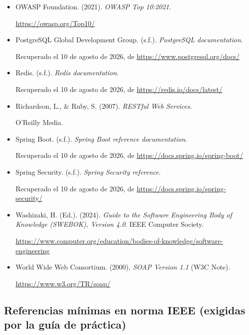 \documentclass[12pt,a4paper]{article}
\begin{document}
\begin{itemize}[leftmargin=1.5cm, itemindent=-1.5cm, itemsep=5pt]
  \item \hypertarget{ref:owasp}{OWASP Foundation. (2021). \textit{OWASP Top 10:2021}.} \url{https://owasp.org/Top10/}
  \item \hypertarget{ref:postgres}{PostgreSQL Global Development Group. (s.f.). \textit{PostgreSQL documentation}.} Recuperado el 10 de agosto de 2026, de \url{https://www.postgresql.org/docs/}
  \item \hypertarget{ref:redis}{Redis. (s.f.). \textit{Redis documentation}.} Recuperado el 10 de agosto de 2026, de \url{https://redis.io/docs/latest/}
  \item \hypertarget{ref:richardson}{Richardson, L., \& Ruby, S. (2007). \textit{RESTful Web Services}.} O'Reilly Media.
  \item \hypertarget{ref:springboot}{Spring Boot. (s.f.). \textit{Spring Boot reference documentation}.} Recuperado el 10 de agosto de 2026, de \url{https://docs.spring.io/spring-boot/}
  \item \hypertarget{ref:springsecurity}{Spring Security. (s.f.). \textit{Spring Security reference}.} Recuperado el 10 de agosto de 2026, de \url{https://docs.spring.io/spring-security/}
  \item \hypertarget{ref:washizaki}{Washizaki, H. (Ed.). (2024). \textit{Guide to the Software Engineering Body of Knowledge (SWEBOK), Version 4.0}. IEEE Computer Society.} \url{https://www.computer.org/education/bodies-of-knowledge/software-engineering}
  \item \hypertarget{ref:w3c}{World Wide Web Consortium. (2000). \textit{SOAP Version 1.1} (W3C Note).} \url{https://www.w3.org/TR/soap/}
\end{itemize}

\subsection*{Referencias mínimas en norma IEEE (exigidas por la guía de práctica)}
\end{document}
